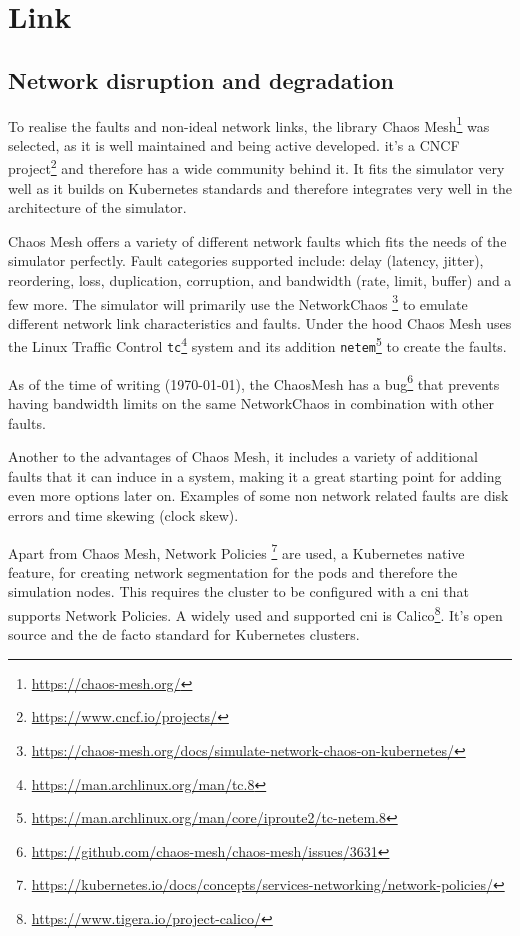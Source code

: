 \section{Link}

\subsection{Network disruption and degradation}

To realise the faults and non-ideal network links, the library Chaos Mesh\footnote{\url{https://chaos-mesh.org/}} was selected, as it is well maintained and being active developed. it's a CNCF project\footnote{\url{https://www.cncf.io/projects/}} and therefore has a wide community behind it.
It fits the simulator very well as it builds on Kubernetes standards and therefore integrates very well in the architecture of the simulator.

Chaos Mesh offers a variety of different network faults which fits the needs of the simulator perfectly. Fault categories supported include: delay (latency, jitter), reordering, loss, duplication, corruption, and bandwidth (rate, limit, buffer) and a few more.
The simulator will primarily use the NetworkChaos \footnote{\url{https://chaos-mesh.org/docs/simulate-network-chaos-on-kubernetes/}} to emulate different network link characteristics and faults.
Under the hood Chaos Mesh uses the Linux Traffic Control \verb|tc|\footnote{\url{https://man.archlinux.org/man/tc.8}} system and its addition \verb|netem|\footnote{\url{https://man.archlinux.org/man/core/iproute2/tc-netem.8}} to create the faults.

As of the time of writing (\today), the ChaosMesh has a bug\footnote{\url{https://github.com/chaos-mesh/chaos-mesh/issues/3631}} that prevents having bandwidth limits on the same NetworkChaos in combination with other faults.

Another to the advantages of Chaos Mesh, it includes a variety of additional faults that it can induce in a system, making it a great starting point for adding even more options later on. Examples of some non network related faults are disk errors and time skewing (clock skew).

Apart from Chaos Mesh, Network Policies \footnote{\url{https://kubernetes.io/docs/concepts/services-networking/network-policies/}} are used, a Kubernetes native feature, for creating network segmentation for the pods and therefore the simulation nodes.
This requires the cluster to be configured with a \ac{cni} that supports Network Policies. A widely used and supported \ac{cni} is Calico\footnote{\url{https://www.tigera.io/project-calico/}}. It's open source and the de facto standard for Kubernetes clusters.

